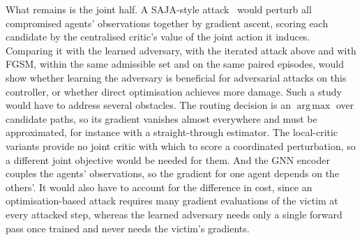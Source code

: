 What remains is the joint half. A SAJA-style
attack~\cite{guo2025sajastateactionjointattack} would perturb all compromised agents'
observations together by gradient ascent, scoring each candidate by the centralised
critic's value of the joint action it induces. Comparing it with the learned adversary,
with the iterated attack above and with FGSM, within the same
admissible set and on the same paired episodes, would show whether learning the
adversary is beneficial for adversarial attacks on this controller, or whether direct
optimisation achieves more damage. Such a study would have to address several obstacles.
The routing decision is an $\operatorname{arg\,max}$ over candidate paths, so its gradient vanishes
almost everywhere and must be approximated, for instance with a straight-through
estimator. The local-critic variants provide no joint critic with which to score a
coordinated perturbation, so a different joint objective would be needed for them. And
the GNN encoder couples the agents' observations, so the gradient for one agent depends
on the others'. It would also have to account for the difference in cost, since an
optimisation-based attack requires many gradient evaluations of the victim at every
attacked step, whereas the learned adversary needs only a single forward pass once
trained and never needs the victim's gradients.
